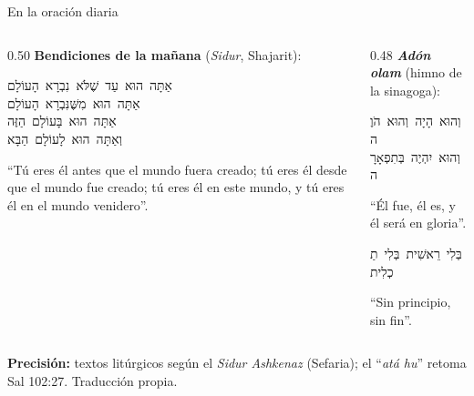 \documentclass[hyperref={bookmarks=false},aspectratio=169]{beamer}
\newcommand{\heb}[1]{\mbox{\foreignlanguage{hebrew}{#1}}}
\newcommand{\precision}[1]{{\footnotesize\color{gris}\textbf{Precisión:} #1}}
\begin{document}
\begin{frame}{En la oración diaria}
\begin{columns}[t,onlytextwidth]
\begin{column}{0.50\textwidth}\small
\textbf{Bendiciones de la mañana} (\emph{Sidur}, Shajarit):
\begin{center}\heb{אַתָּה הוּא עַד שֶׁלֹּא נִבְרָא הָעוֹלָם}\\ \heb{אַתָּה הוּא מִשֶּׁנִּבְרָא הָעוֹלָם}\\ \heb{אַתָּה הוּא בָּעוֹלָם הַזֶּה}\\ \heb{וְאַתָּה הוּא לָעוֹלָם הַבָּא}\end{center}
``Tú eres él antes que el mundo fuera creado; tú eres él desde que el mundo fue creado; tú eres él en este mundo, y tú eres él en el mundo venidero''.
\end{column}
\begin{column}{0.48\textwidth}\small
\textbf{\emph{Adón olam}} (himno de la sinagoga):
\begin{center}\heb{וְהוּא הָיָה וְהוּא הֹוֶה}\\ \heb{וְהוּא יִהְיֶה בְּתִפְאָרָה}\end{center}
``Él fue, él es, y él será en gloria''.
\begin{center}\heb{בְּלִי רֵאשִׁית בְּלִי תַכְלִית}\end{center}
``Sin principio, sin fin''.
\end{column}
\end{columns}\par\smallskip
\precision{textos litúrgicos según el \emph{Sidur Ashkenaz} (Sefaria); el ``\emph{atá hu}'' retoma Sal 102:27. Traducción propia.}
\end{frame}
\end{document}
